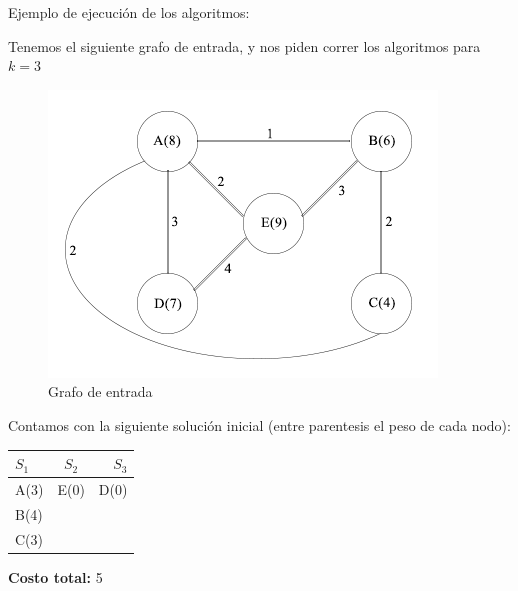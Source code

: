 Ejemplo de ejecución de los algoritmos:

Tenemos el siguiente grafo de entrada, y nos piden correr los algoritmos para $k=3$

\begin{figure}[H]
    \centering
    \includegraphics[scale=0.7]{ejercicio-4-ejemplo-entrada.png}
    \caption{Grafo de entrada}
    \label{fig:ej4_ejemplo}
\end{figure}

Contamos con la siguiente solución inicial (entre parentesis el peso de cada nodo):
\begin{center}
  \begin{tabular}{ l | c | r }
    $S_{1}$ & $S_{2}$ & $S_{3}$ \\ \hline
    A(3) & E(0) & D(0) \\
    B(4) &  &  \\
    C(3) &  &  \\
  \end{tabular}
  \textbf{Costo total:} 5
\end{center}

